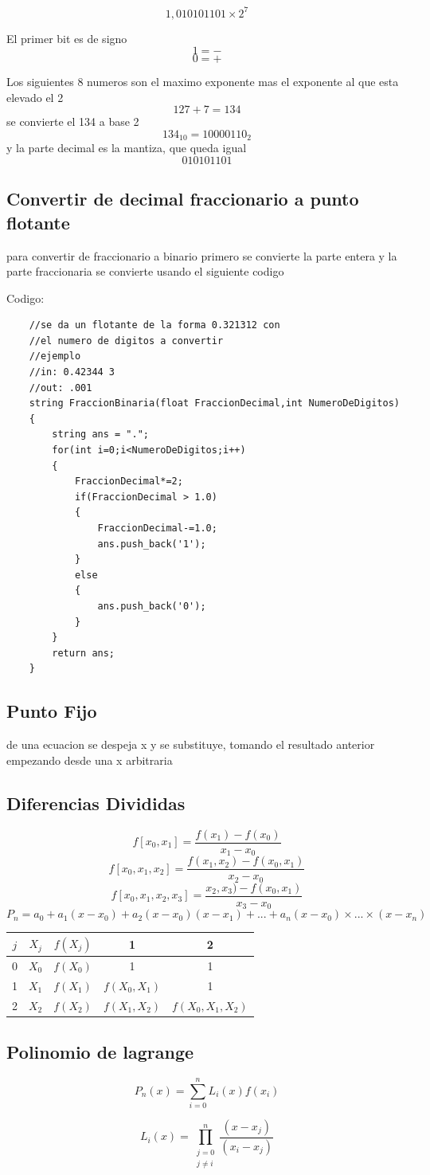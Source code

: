 $$1,010101101 \times 2^7 $$

El primer bit es de signo $$1 = -$$ $$0 = +$$

Los siguientes 8 numeros son el maximo exponente mas el exponente al que esta
elevado el 2 $$127+7 = 134$$ se convierte el 134 a base 2
$$134_10 = 10000110_2$$ y la parte decimal es la mantiza, que queda igual
$$010101101$$

\newpage
\subsection{Convertir de decimal fraccionario a punto flotante}
para convertir de fraccionario a binario primero se convierte la parte entera y la parte fraccionaria se convierte usando el siguiente codigo

Codigo:

\begin{verbatim}
	//se da un flotante de la forma 0.321312 con 
	//el numero de digitos a convertir
	//ejemplo
	//in: 0.42344 3
	//out: .001
	string FraccionBinaria(float FraccionDecimal,int NumeroDeDigitos)
	{
		string ans = ".";
		for(int i=0;i<NumeroDeDigitos;i++)
		{
			FraccionDecimal*=2;
			if(FraccionDecimal > 1.0)
			{
				FraccionDecimal-=1.0;
				ans.push_back('1');
			}
			else
			{
				ans.push_back('0');
			}
		}
		return ans;
	}
\end{verbatim}

\subsection{Punto Fijo}
de una ecuacion se despeja x y se substituye, tomando el resultado anterior
empezando desde una x arbitraria
\subsection{Diferencias Divididas}
$$f[x_0,x_1] = \frac{f(x_1)-f(x_0)}{x_1-x_0}$$
$$f[x_0,x_1,x_2] = \frac{f(x_1,x_2)-f(x_0,x_1)}{x_2-x_0}$$
$$ f[x_0,x_1,x_2,x_3] = \frac{x_2,x_3) - f(x_0,x_1)}{x_3-x_0}$$
$$P_n = a_0 + a_1(x-x_0) + a_2(x-x_0)(x-x_1) + ... + a_n(x-x_0) \times ... \times (x-x_n)$$

\begin{center}
 \begin{tabular}{|c c c c c|} 
 \hline
	 $j$ & $X_j$ & $f(X_j)$ & 1 & 2  \\ [0.5ex] 
 \hline\hline
	 0 & $X_0$ & $f(X_0)$ & 1 &  1 \\
 \hline
	 1 & $X_1$ & $f(X_1)$ & $f(X_0,X_1)$ & 1 \\
 \hline
	 2 & $X_2$ & $f(X_2)$ & $f(X_1,X_2)$ & $f(X_0,X_1,X_2)$ \\
 \hline
\end{tabular}
\end{center}
\subsection{Polinomio de lagrange}
$$P_n(x) = \sum_{i=0}^{n} L_i(x)f(x_i)$$

$$
L_i(x) = \prod_{\substack{j=0 \\
	j \neq i}}^{n}
	\frac{(x-x_j)}{(x_i-x_j)}
$$



